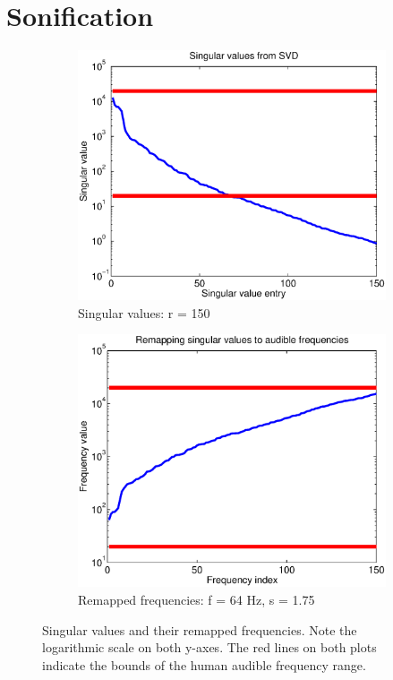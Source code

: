 \documentclass[11pt]{article}
\begin{document}
\section*{Sonification}

\begin{figure}
	\begin{subfigure}[h]{0.5\textwidth}
		\includegraphics[width=\textwidth]{figures/singulars.eps}
		\caption{Singular values: r = 150} 
		\label{fig:singulars}
	\end{subfigure}
	\begin{subfigure}[h]{0.5\textwidth}
		\includegraphics[width=\textwidth]{figures/remap_freqs.eps}
		\caption{Remapped frequencies: f = 64 Hz, s = 1.75}
		\label{fig:freqs}
	\end{subfigure}
	\caption{Singular values and their remapped frequencies. Note the logarithmic scale on both y-axes. The red lines on both plots indicate the bounds of the human audible frequency range.}
\end{figure}
\end{document}
